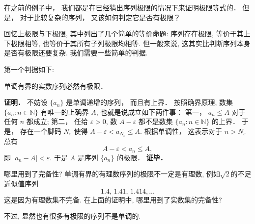 

在之前的例子中， 我们都是在已经猜出序列极限的情况下来证明极限等式的． 但是， 对于比较复杂的序列， 又该如何判定它是否有极限？

回忆上极限与下极限, 其中列出了几个简单的等价命题: 序列存在极限, 等价于其上下极限相等, 也等价于其所有子列极限均相等. 但一般来说, 这其实比判断序列本身是否有极限还要复杂. 我们需要一些简单的判据.

第一个判据如下:

\begin{theorem}{}
单调有界的实数序列必然有极限．
\end{theorem}
\textbf{证明．} 不妨设 $\{a_n\}$ 是单调递增的序列， 而且有上界． 按照确界原理, 数集 $\{a_n:n\in\mathbb{N}\}$ 有唯一的上确界 $A$, 也就是说成立如下两件事： 第一， $a_n\leq A$ 对于任何 $n$ 都成立; 第二， 任给 $\varepsilon>0$, 数 $A-\varepsilon$ 都不是数集 $\{a_n:n\in\mathbb{N}\}$ 的上界． 于是， 存在一个脚码 $N_\varepsilon$ 使得 $A-\varepsilon<a_{N_\varepsilon}\leq A$. 根据单调性， 这表示对于 $n>N_\varepsilon$ 总有
\[A-\varepsilon<a_n\leq A,\]
即 $|a_n-A|<\varepsilon$. 于是 $A$ 是序列 $\{a_n\}$ 的极限． \textbf{证毕．}

\begin{exercise}{哪里用到了完备性?}
单调有界的有理数序列的极限不一定是有理数, 例如$\sqrt{2}$的不足近似值序列
$$
1.4,\,1.41,\,1.414,...
$$
这是因为有理数集不完备. 在上面的证明中, 哪里用到了实数集的完备性?
\end{exercise}

不过, 显然也有很多有极限的序列不是单调的. 